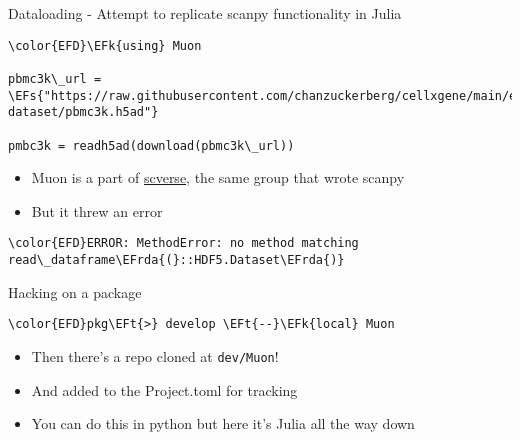 \documentclass[bigger]{beamer}
\newcommand{\EFs}[1]{\textcolor{EFs}{#1}} %
\newcommand{\EFk}[1]{\textcolor{EFk}{#1}} %
\newcommand{\EFt}[1]{\textcolor{EFt}{#1}} %
\newcommand{\EFrda}[1]{\textcolor{EFrda}{#1}} %
\begin{document}
\begin{frame}[label={sec:org11de45d},fragile]{Dataloading - Attempt to replicate scanpy functionality in Julia}
 \begin{Code}
\begin{Verbatim}
\color{EFD}\EFk{using} Muon

pbmc3k\_url = \EFs{"https://raw.githubusercontent.com/chanzuckerberg/cellxgene/main/example-dataset/pbmc3k.h5ad"}

pmbc3k = readh5ad(download(pbmc3k\_url))
\end{Verbatim}
\end{Code}

\begin{itemize}
\item Muon is a part of \href{https://scverse.org/}{scverse}, the same group that wrote scanpy
\item But it threw an error
\end{itemize}

\small
\begin{Code}
\begin{Verbatim}
\color{EFD}ERROR: MethodError: no method matching read\_dataframe\EFrda{(}::HDF5.Dataset\EFrda{)}
\end{Verbatim}
\end{Code}
\end{frame}

\begin{frame}[label={sec:org9d29ec8},fragile]{Hacking on a package}
 \begin{Code}
\begin{Verbatim}
\color{EFD}pkg\EFt{>} develop \EFt{--}\EFk{local} Muon
\end{Verbatim}
\end{Code}

\begin{itemize}
\item Then there's a repo cloned at \texttt{dev/Muon}!
\item And added to the Project.toml for tracking
\end{itemize}
\pause
\begin{itemize}
\item You can do this in python but here it's Julia all the way down
\end{itemize}
\end{frame}
\end{document}

